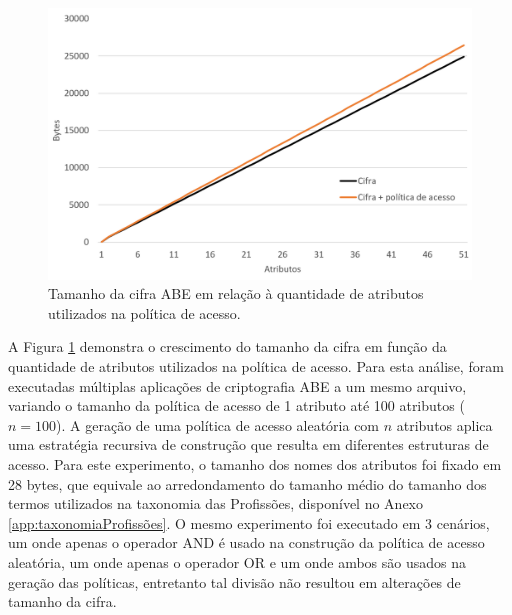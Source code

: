 \documentclass[a4paper,11pt]{article}
\begin{document}
\begin{figure}[!h]
  \centering
  \includegraphics[width=\textwidth]{images/resultados-tamanho-cifra-crescimento.png}
  \caption{Tamanho da cifra ABE em relação à quantidade de atributos utilizados na política de acesso.}
  \label{fig:crescimento-cifra}
\end{figure}

A Figura \ref{fig:crescimento-cifra} demonstra o crescimento do tamanho da cifra em função da quantidade de atributos utilizados na política de acesso.
Para esta análise, foram executadas múltiplas aplicações de criptografia ABE a um mesmo arquivo, variando o tamanho da política de acesso de 1 atributo até 100 atributos ($n=100$).
A geração de uma política de acesso aleatória com $n$ atributos aplica uma estratégia recursiva de construção que resulta em diferentes estruturas de acesso.
Para este experimento, o tamanho dos nomes dos atributos foi fixado em 28 bytes, que equivale ao arredondamento do tamanho médio do tamanho dos termos utilizados na taxonomia das Profissões, disponível no Anexo \ref{app:taxonomiaProfissões}.
O mesmo experimento foi executado em 3 cenários, um onde apenas o operador AND é usado na construção da política de acesso aleatória, um onde apenas o operador OR e um onde ambos são usados na geração das políticas, entretanto tal divisão não resultou em alterações de tamanho da cifra.
\end{document}
